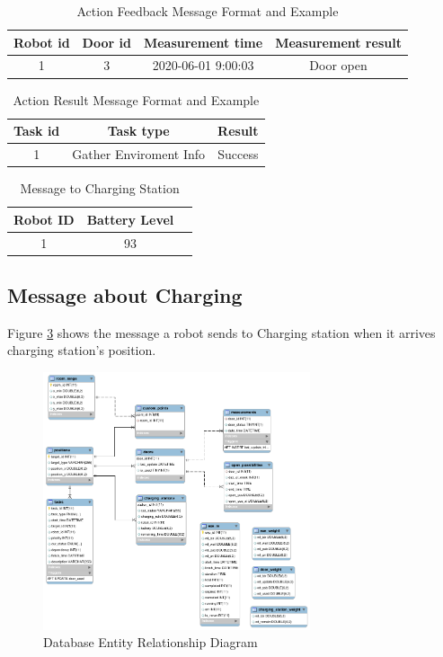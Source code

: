 \begin{table}[htb]
\centering
\begin{tabular}{|c|c|c|c|} 
\hline
Robot id & Door id & Measurement time & Measurement result \\
\hline\hline
1	& 3	& 2020-06-01 9:00:03 & Door open \\ [1ex] 
\hline
\end{tabular}
\caption{Action Feedback Message Format and Example}
\label{tab:feedback_message}
\end{table}

\begin{table}[htb]
\centering
\begin{tabular}{|c|c|c|} 
\hline
Task id	& Task type	& Result\\
\hline\hline
1 & Gather Enviroment Info & Success \\ [1ex] 
\hline
\end{tabular}
\caption{Action Result Message Format and Example}
\label{tab:result_message}
\end{table}


\begin{table}[htb]
\centering
\begin{tabular}{|c|c|c|} 
\hline
Robot ID & Battery Level \\
\hline\hline
1 & 93 \\ [1ex] 
\hline
\end{tabular}
\caption{Message to Charging Station}
\label{tab:message_to_charging_staion}
\end{table}

\subsection{Message about Charging}
  
Figure \ref{tab:message_to_charging_staion} shows the message a robot sends to Charging station when it arrives charging station's position.


\begin{figure}[htbp]
    \centering
    \includegraphics[width = 0.7\textwidth]{content/images/ch4/database_er.png}
    \caption{Database Entity Relationship Diagram}
    \label{fig:database_er}
\end{figure}


